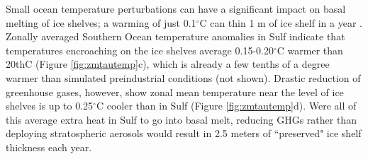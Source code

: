 \documentclass{nature}
\begin{document}


Small ocean temperature perturbations can have a significant impact on basal melting of ice shelves; a warming of just 0.1$^\circ$C can thin 1 m of ice shelf in a year \cite{rignot02}. Zonally averaged Southern Ocean temperature anomalies in Sulf indicate that temperatures encroaching on the ice shelves average 0.15-0.20$^\circ$C warmer than 20thC (Figure \ref{fig:zmtautemp}c), which is already a few tenths of a degree warmer than simulated preindustrial conditions (not shown). Drastic reduction of greenhouse gases, however, show zonal mean temperature near the level of ice shelves is up to 0.25$^\circ$C cooler than in Sulf (Figure \ref{fig:zmtautemp}d). Were all of this average extra heat in Sulf to go into basal melt, reducing GHGs rather than deploying stratospheric aerosols would result in 2.5 meters of ``preserved" ice shelf thickness each year. 
\end{document}

